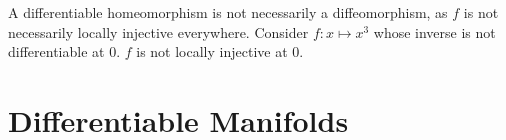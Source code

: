 \documentclass{article}
\begin{document}
\begin{remark}
    A differentiable homeomorphism is not necessarily a diffeomorphism, as $f$ is not necessarily locally injective everywhere. Consider $f: x \mapsto x^3$ whose inverse is not differentiable at $0$. $f$ is not locally injective at 0.  
\end{remark}

\section{Differentiable Manifolds}
\end{document}
